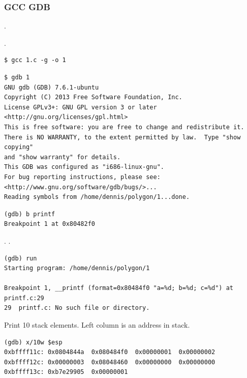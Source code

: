 \subsubsection{GCC \AndENRU GDB}

.

 .

\begin{lstlisting}
$ gcc 1.c -g -o 1
\end{lstlisting}

\begin{lstlisting}
$ gdb 1
GNU gdb (GDB) 7.6.1-ubuntu
Copyright (C) 2013 Free Software Foundation, Inc.
License GPLv3+: GNU GPL version 3 or later <http://gnu.org/licenses/gpl.html>
This is free software: you are free to change and redistribute it.
There is NO WARRANTY, to the extent permitted by law.  Type "show copying"
and "show warranty" for details.
This GDB was configured as "i686-linux-gnu".
For bug reporting instructions, please see:
<http://www.gnu.org/software/gdb/bugs/>...
Reading symbols from /home/dennis/polygon/1...done.
\end{lstlisting}

\begin{lstlisting}[caption=\IFRU{установим брякпойнт на}{let's set breakpoint on} \printf]
(gdb) b printf
Breakpoint 1 at 0x80482f0
\end{lstlisting}

.
 \printf 
{}.

\begin{lstlisting}
(gdb) run
Starting program: /home/dennis/polygon/1 

Breakpoint 1, __printf (format=0x80484f0 "a=%d; b=%d; c=%d") at printf.c:29
29	printf.c: No such file or directory.
\end{lstlisting}

{Print 10 stack elements. Left column is an address in stack.}

\begin{lstlisting}
(gdb) x/10w $esp
0xbffff11c:	0x0804844a	0x080484f0	0x00000001	0x00000002
0xbffff12c:	0x00000003	0x08048460	0x00000000	0x00000000
0xbffff13c:	0xb7e29905	0x00000001
\end{lstlisting}

